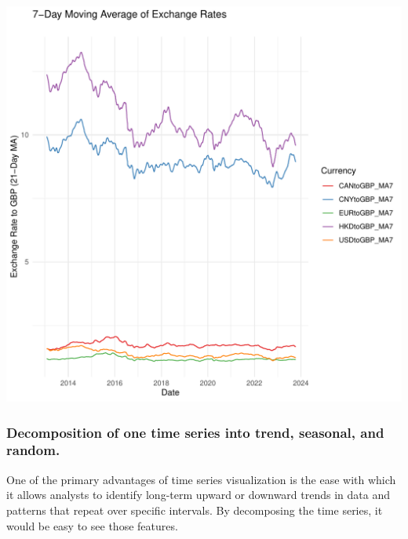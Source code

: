 \documentclass{article}\usepackage[]{graphicx}\usepackage[]{xcolor}
\makeatletter
\def\maxwidth{ %
  \ifdim\Gin@nat@width>\linewidth
    \linewidth
  \else
    \Gin@nat@width
  \fi
}
\newenvironment{kframe}{%
 \def\at@end@of@kframe{}%
 \ifinner\ifhmode%
  \def\at@end@of@kframe{\end{minipage}}%
  \begin{minipage}{\columnwidth}%
 \fi\fi%
 \def\FrameCommand##1{\hskip\@totalleftmargin \hskip-\fboxsep
 \colorbox{shadecolor}{##1}\hskip-\fboxsep
     \hskip-\linewidth \hskip-\@totalleftmargin \hskip\columnwidth}%
 \MakeFramed {\advance\hsize-\width
   \@totalleftmargin\z@ \linewidth\hsize
   \@setminipage}}%
 {\par\unskip\endMakeFramed%
 \at@end@of@kframe}
\newenvironment{knitrout}{}{} %
\makeatother
\begin{document}
\begin{knitrout}
\begin{kframe}
{\ttfamily\noindent\color{warningcolor}{\#\# Warning: Removed 100 rows containing missing values (`geom\_line()`).}}\end{kframe}
\includegraphics[width=\maxwidth]{figure/unnamed-chunk-2-1} 
\end{knitrout}


\subsubsection{Decomposition of one time series into trend, seasonal, and random.}


One of the primary advantages of time series visualization is the ease with which it allows analysts to identify long-term upward or downward trends in data and patterns that repeat over specific intervals. By decomposing the time series, it would be easy to see those features.

\begin{knitrout}
\color{fgcolor}\begin{kframe}


{\ttfamily\noindent\bfseries\color{errorcolor}{\#\# Error in `ensure\_igraph()`:\\\#\# ! Must provide a graph object (provided wrong object type).}}\end{kframe}
\end{knitrout}
\end{document}
